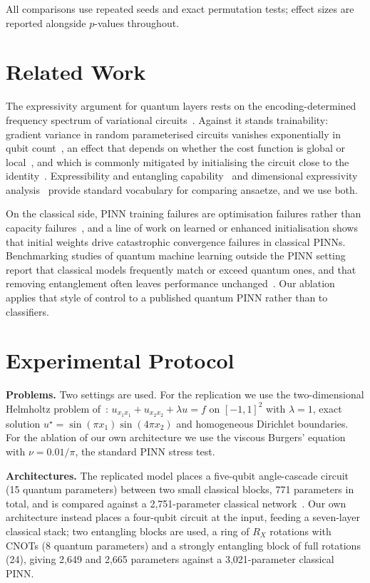 \documentclass[conference,a4paper]{IEEEtran}
\begin{document}
All comparisons use repeated seeds and exact permutation tests; effect sizes are reported
alongside $p$-values throughout.

\section{Related Work}

The expressivity argument for quantum layers rests on the encoding-determined frequency
spectrum of variational circuits~\cite{schuld}. Against it stands trainability: gradient
variance in random parameterised circuits vanishes exponentially in qubit
count~\cite{mcclean}, an effect that depends on whether the cost function is global or
local~\cite{cerezo}, and which is commonly mitigated by initialising the circuit close to
the identity~\cite{grant}. Expressibility and entangling capability~\cite{sim} and
dimensional expressivity analysis~\cite{funcke} provide standard vocabulary for comparing
ansaetze, and we use both.

On the classical side, PINN training failures are optimisation failures rather than
capacity failures~\cite{krishnapriyan}, and a line of work on learned or enhanced
initialisation shows that initial weights drive catastrophic convergence failures in
classical PINNs. Benchmarking studies of quantum machine learning outside the PINN setting
report that classical models frequently match or exceed quantum ones, and that removing
entanglement often leaves performance unchanged~\cite{bowles}. Our ablation applies that
style of control to a published quantum PINN rather than to classifiers.

\section{Experimental Protocol}

\textbf{Problems.} Two settings are used. For the replication we use the
two-dimensional Helmholtz problem of~\cite{qcpinn}: $u_{x_1x_1} + u_{x_2x_2} + \lambda u
= f$ on $[-1,1]^2$ with $\lambda = 1$, exact solution $u^\star = \sin(\pi
x_1)\sin(4\pi x_2)$ and homogeneous Dirichlet boundaries. For the ablation of our own
architecture we use the viscous Burgers' equation with $\nu = 0.01/\pi$, the standard PINN
stress test.

\textbf{Architectures.} The replicated model places a five-qubit angle-cascade circuit
(15 quantum parameters) between two small classical blocks, 771 parameters in total, and
is compared against a 2{,}751-parameter classical network~\cite{qcpinn}. Our own
architecture instead places a four-qubit circuit at the input, feeding a seven-layer
classical stack; two entangling blocks are used, a ring of $R_X$ rotations with CNOTs (8
quantum parameters) and a strongly entangling block of full rotations (24), giving 2{,}649
and 2{,}665 parameters against a 3{,}021-parameter classical PINN.
\end{document}
